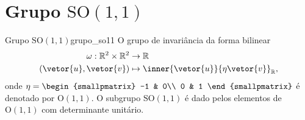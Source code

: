 \section[Grupo SO(1,1)]{Grupo \(\mathrm{SO}(1,1)\)}
\begin{definition}{Grupo \(\mathrm{SO}(1,1)\)}{grupo_so11}
    O grupo de invariância da forma bilinear
    \begin{align*}
        \omega : \mathbb{R}^2 \times \mathbb{R}^2 &\to \mathbb{R}\\
                            (\vetor{u},\vetor{v}) &\mapsto \inner{\vetor{u}}{\eta\vetor{v}}_{\mathbb{R}},
    \end{align*}
    onde \(\eta = \begin{smallpmatrix}
        -1 & 0\\
        0 & 1
    \end{smallpmatrix}\) é denotado por \(\mathrm{O}(1,1)\). O subgrupo \(\mathrm{SO}(1,1)\) é dado pelos elementos de \(\mathrm{O}(1,1)\) com determinante unitário.
\end{definition}

